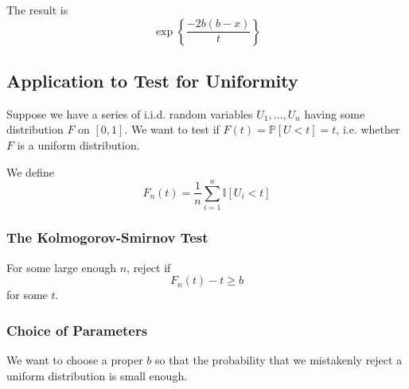         The result is
        \[ \exp\left\{ \frac{-2b(b-x)}{t} \right\} \]

    \subsection{Application to Test for Uniformity}
        Suppose we have a series of i.i.d. random variables $U_1, \dots, U_n$ having some distribution $F$ on $[0,1]$. We want to test if $F(t)=\mathbb{P}[U < t]=t$, i.e. whether $F$ is a uniform distribution.

        We define
        \[ F_n(t) = \frac{1}{n} \sum_{i=1}^n \mathbb{I}[U_i < t] \]

        \subsubsection{The Kolmogorov-Smirnov Test}
            For some large enough $n$, reject if
            \[ F_n(t) - t \ge b \]
            for some $t$.

        \subsubsection{Choice of Parameters}
            We want to choose a proper $b$ so that the probability that we mistakenly reject a uniform distribution is small enough.
